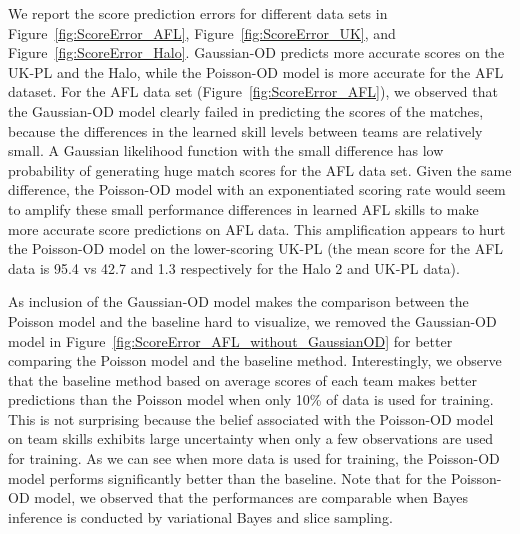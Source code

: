 We report the score prediction errors for different data sets in Figure~\ref{fig:ScoreError_AFL}, Figure~\ref{fig:ScoreError_UK}, and Figure~\ref{fig:ScoreError_Halo}. Gaussian-OD predicts more accurate scores on the UK-PL and the Halo, while the Poisson-OD model is more accurate for the AFL dataset. For the AFL data set (Figure~\ref{fig:ScoreError_AFL}), we observed that the Gaussian-OD model clearly failed in predicting the scores of the matches, because the differences in the learned skill levels between teams are relatively small. A Gaussian likelihood function with the small difference has low probability of generating huge match scores for the AFL data set. Given the same difference, the Poisson-OD model with an exponentiated scoring rate would seem to amplify these small performance differences in learned AFL skills to make more accurate score predictions on AFL data.  This amplification appears to hurt the Poisson-OD model on the lower-scoring UK-PL (the mean score for the AFL data is 95.4 vs 42.7 and 1.3 respectively for the Halo 2 and UK-PL data).

\begin{center}
\begin{figure*}[htbp!]
 \centering
\caption{\small Results on the AFL data set, evaluated using win/loss prediction accuracy in
term of the area of the curve (AUC). Error bars indicate
standard errors.}
\label{fig:ScoreError_AFL}
\end{figure*}
\end{center}

As inclusion of the Gaussian-OD model makes the comparison between the Poisson model and the baseline hard to visualize, we removed the Gaussian-OD model in Figure~\ref{fig:ScoreError_AFL_without_GaussianOD} for better comparing the Poisson model and the baseline method. Interestingly, we observe that the baseline method based on average scores of each team makes better predictions than the Poisson model when only 10\% of data is used for training. This is not surprising because the belief associated with the Poisson-OD model on team skills exhibits large uncertainty when only a few observations are used for training. As we can see when more data is used for training, the Poisson-OD model performs significantly better than the baseline. Note that for the Poisson-OD model, we observed that the performances are comparable when Bayes inference is conducted by variational Bayes and slice sampling.
 
\begin{center}
\begin{figure*}[htbp!]
 \centering
\caption{\small Results on the AFL data set, evaluated using win/loss prediction accuracy in
term of the area of the curve (AUC). Error bars indicate
standard errors.}
\label{fig:ScoreError_AFL_without_GaussianOD}
\end{figure*}
\end{center}

